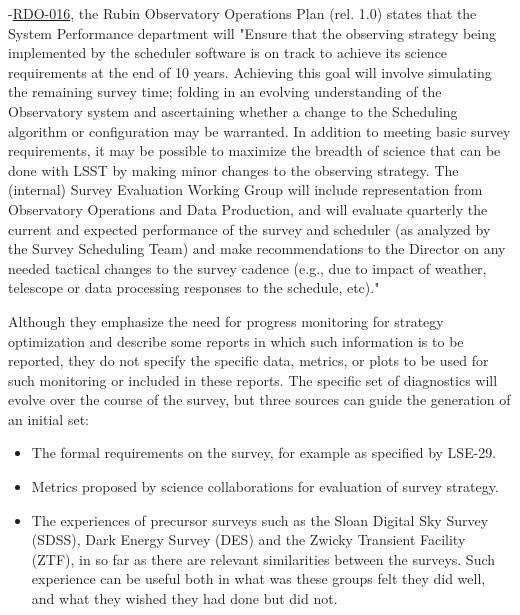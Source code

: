 -\href{https://ls.st/rdo-016}{RDO-016}, the Rubin Observatory Operations Plan (rel. 1.0) states that the System Performance department will "Ensure that the observing strategy being implemented by the scheduler software is on track to achieve its science requirements at the end of 10 years. Achieving this goal will involve simulating the remaining survey time; folding in an evolving understanding of the Observatory system and ascertaining whether a change to the Scheduling algorithm or configuration may be warranted. In addition to meeting basic survey requirements, it may be possible to maximize the breadth of science that can be done with LSST by making minor changes to the observing strategy. The (internal) Survey Evaluation Working Group will include representation from Observatory Operations and Data Production, and will evaluate quarterly the current and expected performance of the survey and scheduler (as analyzed by the Survey Scheduling Team) and make recommendations to the Director on any needed tactical changes to the survey cadence (e.g., due to impact of weather, telescope or data processing responses to the schedule, etc)."

Although they emphasize the need for progress monitoring for strategy optimization and describe some reports in which such information is to be reported, they do not specify the specific data, metrics, or plots to be used for such monitoring or included in these reports.
The specific set of diagnostics will evolve over the course of the survey, but three sources can guide the generation of an initial set:
\begin{itemize}
\item The formal requirements on the survey, for example as specified by LSE-29.
\item Metrics proposed by science collaborations for evaluation of survey strategy.
\item The experiences of precursor surveys such as the Sloan Digital Sky Survey (SDSS), Dark Energy Survey (DES) and the Zwicky Transient Facility (ZTF), in so far as there are relevant similarities between the surveys. Such experience can be useful both in what was these groups felt they did well, and what they wished they had done but did not.
\end{itemize}

